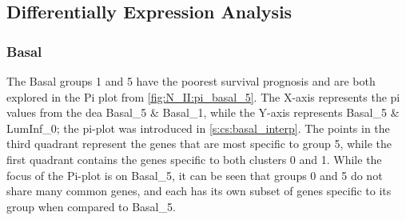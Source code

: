 




\subsection{Differentially Expression Analysis}

\subsubsection*{Basal} \label{s:N_II:basak}

The Basal groups 1 and 5 have the poorest survival prognosis and are both explored in the Pi plot from \cref{fig:N_II:pi_basal_5}. The X-axis represents the pi values from the \acrfull{dea} Basal\_5 \& Basal\_1, while the Y-axis represents Basal\_5 \& LumInf\_0; the pi-plot was introduced in \cref{s:cs:basal_interp}. The points in the third quadrant represent the genes that are most specific to group 5, while the first quadrant contains the genes specific to both clusters 0 and 1. While the focus of the Pi-plot is on Basal\_5, it can be seen that groups 0 and 5 do not share many common genes, and each has its own subset of genes specific to its group when compared to Basal\_5.

